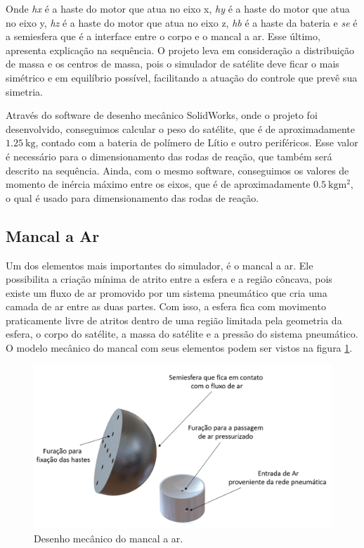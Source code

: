 Onde \textit{hx} é a haste do motor que atua no eixo x, \textit{hy} é a haste do motor que atua no eixo y, \textit{hz} é a haste do motor que atua no eixo z, \textit{hb} é a haste da bateria e \textit{se} é a semiesfera que é a interface entre o corpo e o mancal a ar. Esse último, apresenta explicação na sequência. O projeto leva em consideração a distribuição de massa e os centros de massa, pois o simulador de satélite deve ficar o mais simétrico e em equilíbrio possível, facilitando a atuação do controle que prevê sua simetria.

Através do software de desenho mecânico SolidWorks, onde o projeto foi desenvolvido, conseguimos calcular o peso do satélite, que é de aproximadamente $\SI{1.25}{\kg}$, contado com a bateria de polímero de Lítio e outro periféricos. Esse valor é necessário para o dimensionamento das rodas de reação, que também será descrito na sequência. Ainda, com o mesmo software, conseguimos os valores de momento de inércia máximo entre os eixos, que é de aproximadamente $\SI{0.5}{\kg\meter\squared}$, o qual é usado para dimensionamento das rodas de reação.



\subsection{Mancal a Ar}

Um dos elementos mais importantes do simulador, é o mancal a ar. Ele possibilita a criação mínima de atrito entre a esfera e a região côncava, pois existe um fluxo de ar promovido por um sistema pneumático que cria uma camada de ar entre as duas partes. Com isso, a esfera fica com movimento praticamente livre de atritos dentro de uma região limitada pela geometria da esfera, o corpo do satélite, a massa do satélite e a pressão do sistema pneumático. O modelo mecânico do mancal com seus elementos podem ser vistos na figura \ref{fig:base_desenho}.

\begin{figure}[H]
  \caption{Desenho mecânico do mancal a ar.}
  \begin{center}
      \includegraphics[scale=.45]{metodologia/img/base_desenho}
  \end{center}
  \label{fig:base_desenho}
\end{figure}

